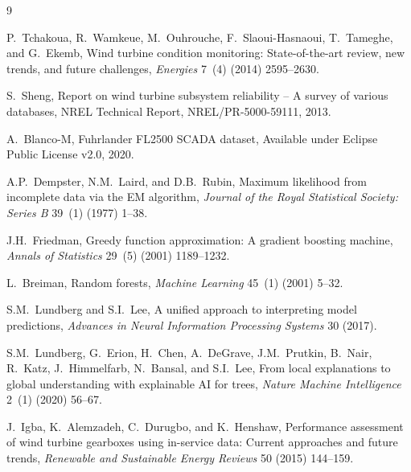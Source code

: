 \documentclass[preprint,12pt]{elsarticle}
\begin{document}
\begin{thebibliography}{9}

P.~Tchakoua, R.~Wamkeue, M.~Ouhrouche, F.~Slaoui-Hasnaoui, T.~Tameghe, and G.~Ekemb,
\newblock Wind turbine condition monitoring: State-of-the-art review, new trends, and future challenges,
\newblock \emph{Energies} 7~(4) (2014) 2595--2630.

S.~Sheng,
\newblock Report on wind turbine subsystem reliability -- A survey of various databases,
\newblock NREL Technical Report, NREL/PR-5000-59111, 2013.

A.~Blanco-M,
\newblock Fuhrlander FL2500 SCADA dataset,
\newblock Available under Eclipse Public License v2.0, 2020.

A.P.~Dempster, N.M.~Laird, and D.B.~Rubin,
\newblock Maximum likelihood from incomplete data via the {EM} algorithm,
\newblock \emph{Journal of the Royal Statistical Society: Series B} 39~(1) (1977) 1--38.

J.H.~Friedman,
\newblock Greedy function approximation: A gradient boosting machine,
\newblock \emph{Annals of Statistics} 29~(5) (2001) 1189--1232.

L.~Breiman,
\newblock Random forests,
\newblock \emph{Machine Learning} 45~(1) (2001) 5--32.

S.M.~Lundberg and S.I.~Lee,
\newblock A unified approach to interpreting model predictions,
\newblock \emph{Advances in Neural Information Processing Systems} 30 (2017).

S.M.~Lundberg, G.~Erion, H.~Chen, A.~DeGrave, J.M.~Prutkin, B.~Nair, R.~Katz, J.~Himmelfarb, N.~Bansal, and S.I.~Lee,
\newblock From local explanations to global understanding with explainable {AI} for trees,
\newblock \emph{Nature Machine Intelligence} 2~(1) (2020) 56--67.

J.~Igba, K.~Alemzadeh, C.~Durugbo, and K.~Henshaw,
\newblock Performance assessment of wind turbine gearboxes using in-service data: Current approaches and future trends,
\newblock \emph{Renewable and Sustainable Energy Reviews} 50 (2015) 144--159.

\end{thebibliography}
\end{document}
